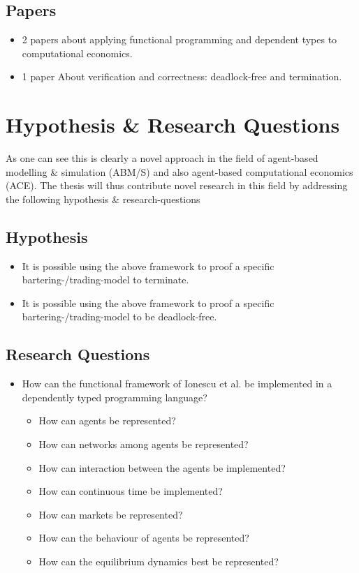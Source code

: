 \documentclass{article}
\begin{document}
\subsection{Papers}
\begin{itemize}
\item 2 papers about applying functional programming and dependent types to computational economics.
\item 1 paper About verification and correctness: deadlock-free and termination. 
\end{itemize}


\section{Hypothesis \& Research Questions}
As one can see this is clearly a novel approach in the field of agent-based modelling \& simulation (ABM/S) and also agent-based computational economics (ACE). The thesis will thus contribute novel research in this field by addressing the following hypothesis \& research-questions 

\subsection{Hypothesis}
\begin{itemize}
\item It is possible using the above framework to proof a specific bartering-/trading-model to terminate.
\item It is possible using the above framework to proof a specific bartering-/trading-model to be deadlock-free.
\end{itemize}

\subsection{Research Questions}
\begin{itemize}
\item How can the functional framework of Ionescu et al. be implemented in a dependently typed programming language?
	\begin{itemize}
	\item How can agents be represented?
	\item How can networks among agents be represented?
	\item How can interaction between the agents be implemented?
	\item How can continuous time be implemented?
	\item How can markets be represented?
	\item How can the behaviour of agents be represented?
	\item How can the equilibrium dynamics best be represented?
	\end{itemize}
\end{itemize}
\end{document}
